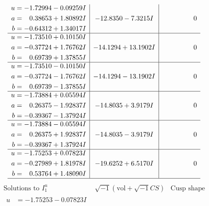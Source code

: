 \documentclass[1p]{elsarticle_modified}
\theoremstyle{definition}
\newcommand{\I}{\sqrt{-1}}
\begin{document}
$$\begin{array}{c|c|c}
\begin{aligned}
u &= -1.72994 - 0.09259 I \\
a &= \phantom{-}0.38653 + 1.80892 I \\
b &= -0.64312 + 1.34017 I\end{aligned}
 & -12.8350 - 7.3215 I & \phantom{-0.000000 } 0 \\ \hline\begin{aligned}
u &= -1.73510 + 0.10150 I \\
a &= -0.37724 + 1.76762 I \\
b &= \phantom{-}0.69739 + 1.37855 I\end{aligned}
 & -14.1294 + 13.1902 I & \phantom{-0.000000 } 0 \\ \hline\begin{aligned}
u &= -1.73510 - 0.10150 I \\
a &= -0.37724 - 1.76762 I \\
b &= \phantom{-}0.69739 - 1.37855 I\end{aligned}
 & -14.1294 - 13.1902 I & \phantom{-0.000000 } 0 \\ \hline\begin{aligned}
u &= -1.73884 + 0.05594 I \\
a &= \phantom{-}0.26375 - 1.92837 I \\
b &= -0.39367 - 1.37924 I\end{aligned}
 & -14.8035 + 3.9179 I & \phantom{-0.000000 } 0 \\ \hline\begin{aligned}
u &= -1.73884 - 0.05594 I \\
a &= \phantom{-}0.26375 + 1.92837 I \\
b &= -0.39367 + 1.37924 I\end{aligned}
 & -14.8035 - 3.9179 I & \phantom{-0.000000 } 0 \\ \hline\begin{aligned}
u &= -1.75253 + 0.07823 I \\
a &= -0.27989 + 1.81978 I \\
b &= \phantom{-}0.53764 + 1.48090 I\end{aligned}
 & -19.6252 + 6.5170 I & \phantom{-0.000000 } 0\\
 \hline 
 \end{array}$$\newpage$$\begin{array}{c|c|c}  
\text{Solutions to }I^u_{1}& \I (\text{vol} + \sqrt{-1}CS) & \text{Cusp shape}\\
 \hline 
\begin{aligned}
u &= -1.75253 - 0.07823 I \\

\end{aligned}
\end{array}$$
\end{document}
